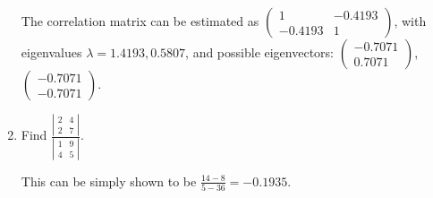\documentclass{article}
\begin{document}
\begin{enumerate}
The correlation matrix can be estimated as $\left( \begin{array}{cc} 1 & -0.4193 \\ -0.4193 & 1 \end{array} \right)$, with eigenvalues $\lambda = 1.4193, 0.5807$, and possible eigenvectors: 
 $\left( \begin{array}{c} -0.7071 \\ 0.7071 \end{array} \right)$, $\left( \begin{array}{c} -0.7071 \\ -0.7071 \end{array} \right)$.

\item Find $\frac{\left| \begin{array}{rr} 2 & 4\\2 & 7 \end{array} \right|}{\left| \begin{array}{rr} 1 & 9\\4 & 5 \end{array} \right| }$.

This can be simply shown to be $\frac{14-8}{5-36} = -0.1935$.

\end{enumerate}
\end{document}
